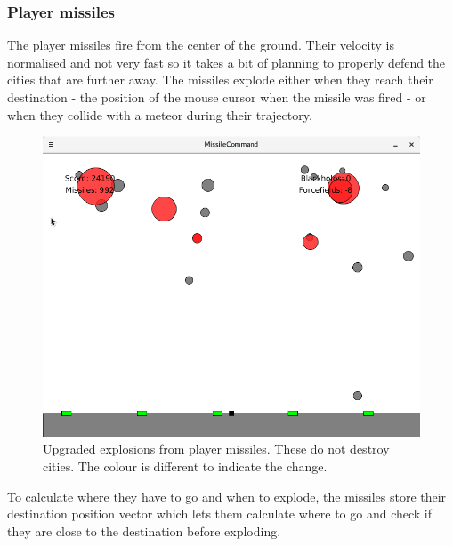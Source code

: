 \documentclass{article}
\begin{document}
\subsubsection*{Player missiles}
The player missiles fire from the center of the ground. Their velocity is normalised and not very fast so it takes a bit of planning to properly defend the cities that are further away. The missiles explode either when they reach their destination - the position of the mouse cursor when the missile was fired - or when they collide with a meteor during their trajectory. 
\begin{figure}[H]
\centering
\includegraphics[width=1\textwidth, keepaspectratio]{imgs/UpgradedExplosion.png}
\caption{Upgraded explosions from player missiles. These do not destroy cities. The colour is different to indicate the change.}
\end{figure}
\noindent
To calculate where they have to go and when to explode, the missiles store their destination position vector which lets them calculate where to go and check if they are close to the destination before exploding. 
\end{document}
